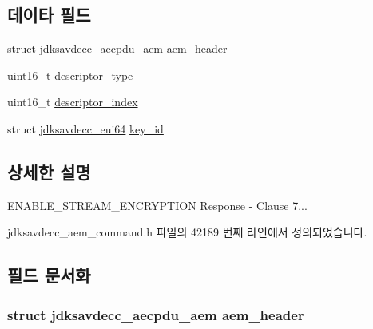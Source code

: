 \subsection*{데이타 필드}
\begin{DoxyCompactItemize}
\item 
struct \hyperlink{structjdksavdecc__aecpdu__aem}{jdksavdecc\+\_\+aecpdu\+\_\+aem} \hyperlink{structjdksavdecc__aem__command__enable__stream__encryption__response_ae1e77ccb75ff5021ad923221eab38294}{aem\+\_\+header}
\item 
uint16\+\_\+t \hyperlink{structjdksavdecc__aem__command__enable__stream__encryption__response_ab7c32b6c7131c13d4ea3b7ee2f09b78d}{descriptor\+\_\+type}
\item 
uint16\+\_\+t \hyperlink{structjdksavdecc__aem__command__enable__stream__encryption__response_a042bbc76d835b82d27c1932431ee38d4}{descriptor\+\_\+index}
\item 
struct \hyperlink{structjdksavdecc__eui64}{jdksavdecc\+\_\+eui64} \hyperlink{structjdksavdecc__aem__command__enable__stream__encryption__response_a37cbdf6056556ccfaee3ab01dc7c3032}{key\+\_\+id}
\end{DoxyCompactItemize}


\subsection{상세한 설명}
E\+N\+A\+B\+L\+E\+\_\+\+S\+T\+R\+E\+A\+M\+\_\+\+E\+N\+C\+R\+Y\+P\+T\+I\+ON Response -\/ Clause 7... 

jdksavdecc\+\_\+aem\+\_\+command.\+h 파일의 42189 번째 라인에서 정의되었습니다.



\subsection{필드 문서화}
\subsubsection[{\texorpdfstring{aem\+\_\+header}{aem_header}}]{\setlength{\rightskip}{0pt plus 5cm}struct {\bf jdksavdecc\+\_\+aecpdu\+\_\+aem} aem\+\_\+header}\hypertarget{structjdksavdecc__aem__command__enable__stream__encryption__response_ae1e77ccb75ff5021ad923221eab38294}{}\label{structjdksavdecc__aem__command__enable__stream__encryption__response_ae1e77ccb75ff5021ad923221eab38294}



